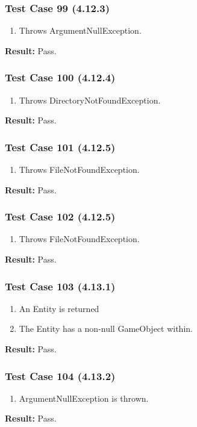\documentclass[a4paper,12pt]{article}
\begin{document}
		\subsubsection{Test Case 99 (4.12.3)}
				\begin{enumerate}
					\item Throws ArgumentNullException.
				\end{enumerate}
			\textbf{Result: }Pass.
		\subsubsection{Test Case 100 (4.12.4)}
				\begin{enumerate}
					\item Throws DirectoryNotFoundException.
				\end{enumerate}
			\textbf{Result: }Pass.
		\subsubsection{Test Case 101 (4.12.5)}
				\begin{enumerate}
					\item Throws FileNotFoundException.
				\end{enumerate}
			\textbf{Result: }Pass.
		\subsubsection{Test Case 102 (4.12.5)}
				\begin{enumerate}
					\item Throws FileNotFoundException.
				\end{enumerate}
			\textbf{Result: }Pass.
		\subsubsection{Test Case 103 (4.13.1)}
				\begin{enumerate}
					\item An Entity is returned
					\item The Entity has a non-null GameObject within.
				\end{enumerate}
			\textbf{Result: }Pass.
		\subsubsection{Test Case 104 (4.13.2)}
				\begin{enumerate}
					\item ArgumentNullException is thrown.
				\end{enumerate}
			\textbf{Result: }Pass.
\end{document}
